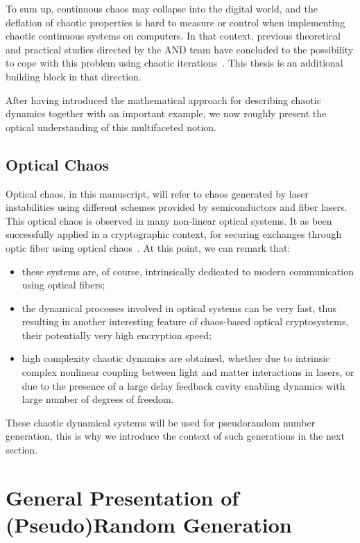 To sum up, continuous chaos may collapse into the digital world, and the deflation of chaotic properties is hard
to measure or control when implementing chaotic
continuous systems on computers.
In that context, previous theoretical and practical
studies directed by the AND team have concluded to
the possibility to cope with this problem using 
chaotic iterations~\cite{GuyeuxThese10,bibtexwangqianxue}. 
This thesis is an additional building block in that
direction.



After having introduced the mathematical approach for describing 
chaotic dynamics together with an important example, we now roughly present
the optical understanding of this multifaceted notion.

\subsection{Optical Chaos}

Optical chaos, in this manuscript, will refer to chaos generated by laser instabilities using different schemes provided by semiconductors and fiber lasers. This optical chaos is observed in many non-linear optical systems.
It as been successfully applied in a cryptographic
context, for securing exchanges through optic fiber 
using optical chaos~\cite{Larger2004609}.
At this point, we can remark that:
\begin{itemize}
\item these systems are, of course, intrinsically dedicated to modern communication using optical fibers;
\item the dynamical processes involved in optical systems can be very fast, thus resulting in another interesting feature of chaos-based optical cryptosystems, their potentially very high encryption speed;
\item high complexity chaotic dynamics are obtained, whether due to intrinsic complex nonlinear coupling between light and matter interactions in lasers, or due to the presence of a large delay feedback cavity enabling dynamics with large number of degrees of freedom.
\end{itemize}

These chaotic dynamical systems will be used for 
pseudorandom number generation, this is why we 
introduce the context of such generations in the
next section. 

\section{General Presentation of (Pseudo)Random Generation}

